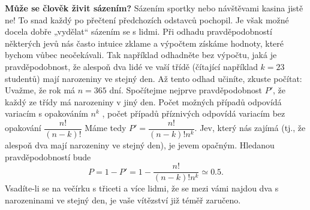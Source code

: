 \wikitextrule
\begin{example}\label{mai:exam063}
  \textbf{Může se člověk živit sázením?}\newline\small
  Sázením sportky nebo návštěvami kasina jistě ne! To snad každý po přečtení předchozích odstavců 
  pochopil. Je však možné docela dobře „vydělat“ sázením se s lidmi. Při odhadu pravděpodobností 
  některých jevů nás často intuice zklame a výpočtem získáme hodnoty, které bychom vůbec 
  neočekávali. Tak například odhadněte bez výpočtu, jaká je pravděpodobnost, že alespoň dva lidé ve 
  vaší třídě (čítající například \(k = 23\) studentů) mají narozeniny ve stejný den. Až tento odhad 
  učiníte, zkuste počítat: Uvažme, že rok má \(n = 365\) dní. Spočítejme nejprve pravděpodobnost 
  \(P'\), že každý ze třídy má narozeniny v jiný den. Počet možných případů odpovídá variacím s 
  opakováním \(n^k\) , počet případů příznivých odpovídá variacím bez opakování 
  \(\dfrac{n!}{(n-k)!}\) Máme tedy \(P'=\dfrac{n!}{(n-k)!n^k}\). Jev, který nás zajímá (tj., že 
  alespoň dva mají narozeniny ve stejný den), je jevem opačným. Hledanou pravděpodobností bude
  \begin{equation*}
    P  = 1 - P' = 1 - \dfrac{n!}{(n - k)!n^k} \simeq \num{0.5}.
  \end{equation*}
  Vsadíte-li se na večírku s třiceti a více lidmi, že se mezi vámi najdou dva s narozeninami ve 
  stejný den, je vaše vítězství již téměř zaručeno.
\normalsize
\end{example}